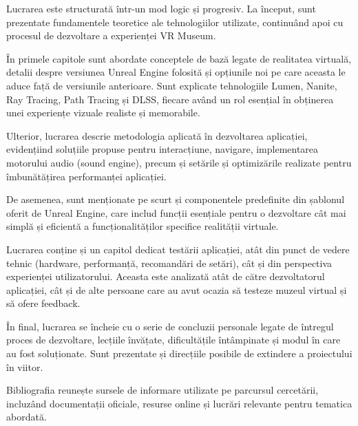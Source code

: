 Lucrarea este structurată într-un mod logic și progresiv. La început, sunt prezentate fundamentele teoretice ale tehnologiilor utilizate, continuând apoi cu procesul de dezvoltare a experienței VR Museum.

În primele capitole sunt abordate conceptele de bază legate de realitatea virtuală, detalii despre versiunea Unreal Engine folosită și opțiunile noi pe care aceasta le aduce față de versiunile anterioare. Sunt explicate tehnologiile Lumen, Nanite, Ray Tracing, Path Tracing și DLSS, fiecare având un rol esențial în obținerea unei experiențe vizuale realiste și memorabile.

Ulterior, lucrarea descrie metodologia aplicată în dezvoltarea aplicației, evidențiind soluțiile propuse pentru interacțiune, navigare, implementarea motorului audio (sound engine), precum și setările și optimizările realizate pentru îmbunătățirea performanței aplicației.

De asemenea, sunt menționate pe scurt și componentele predefinite din șablonul oferit de Unreal Engine, care includ funcții esențiale pentru o dezvoltare cât mai simplă și eficientă a funcționalităților specifice realității virtuale.

Lucrarea conține și un capitol dedicat testării aplicației, atât din punct de vedere tehnic (hardware, performanță, recomandări de setări), cât și din perspectiva experienței utilizatorului. Aceasta este analizată atât de către dezvoltatorul aplicației, cât și de alte persoane care au avut ocazia să testeze muzeul virtual și să ofere feedback.

În final, lucrarea se încheie cu o serie de concluzii personale legate de întregul proces de dezvoltare, lecțiile învățate, dificultățile întâmpinate și modul în care au fost soluționate. Sunt prezentate și direcțiile posibile de extindere a proiectului în viitor.

Bibliografia reunește sursele de informare utilizate pe parcursul cercetării, incluzând documentații oficiale, resurse online și lucrări relevante pentru tematica abordată.
